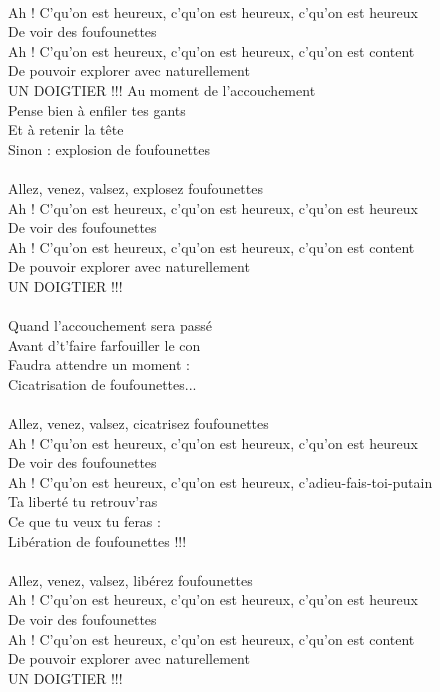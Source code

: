 \\Ah ! C'qu'on est heureux, c'qu'on est heureux, c'qu'on est heureux
\\De voir des foufounettes
\\Ah ! C'qu'on est heureux, c'qu'on est heureux, c'qu'on est content
\\De pouvoir explorer avec naturellement
\\UN DOIGTIER !!!
\breakpage
Au moment de l'accouchement ~~\bissimple
\\Pense bien à enfiler tes gants
\\Et à retenir la tête ~~~~~~~~~~~~~~~~~ \bissimple
\\Sinon : explosion de foufounettes
\\\\Allez, venez, valsez, explosez foufounettes
\\Ah ! C'qu'on est heureux, c'qu'on est heureux, c'qu'on est heureux
\\De voir des foufounettes
\\Ah ! C'qu'on est heureux, c'qu'on est heureux, c'qu'on est content
\\De pouvoir explorer avec naturellement
\\UN DOIGTIER !!!
\\\\Quand l'accouchement sera passé ~~\bissimple
\\Avant d't'faire farfouiller le con
\\Faudra attendre un moment : ~~~~~~~\bissimple
\\Cicatrisation de foufounettes...
\\\\Allez, venez, valsez, cicatrisez foufounettes
\\Ah ! C'qu'on est heureux, c'qu'on est heureux, c'qu'on est heureux
\\De voir des foufounettes
\\Ah ! C'qu'on est heureux, c'qu'on est heureux, c'adieu-fais-toi-putain
\\Ta liberté tu retrouv'ras
\\Ce que tu veux tu feras : ~~~~~~~~~~\bissimple
\\Libération de foufounettes !!!
\\\\Allez, venez, valsez, libérez foufounettes
\\Ah ! C'qu'on est heureux, c'qu'on est heureux, c'qu'on est heureux
\\De voir des foufounettes
\\Ah ! C'qu'on est heureux, c'qu'on est heureux, c'qu'on est content
\\De pouvoir explorer avec naturellement
\\UN DOIGTIER !!!

\breakpage